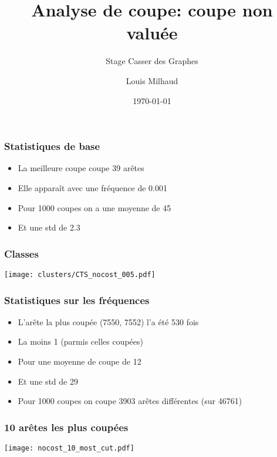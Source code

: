 \documentclass[aspectratio=169]{beamer}
\title{Analyse de coupe: coupe non valuée}
\subtitle{Stage Casser des Graphes}
\author{Louis Milhaud}
\institute{Complex Networks - LIP6}
\date{\today}
\begin{document}
    \begin{frame}
        \titlepage
    \end{frame}

    \begin{frame}
        \frametitle{Statistiques de base}
    
        \begin{itemize}
            \item La meilleure coupe coupe 39 arêtes
            \item Elle apparaît avec une fréquence de 0.001
            \item Pour 1000 coupes on a une moyenne de 45
            \item Et une std de 2.3
        \end{itemize}
    
    \end{frame}

    \begin{frame}
        \frametitle{Classes}
        \centering
        \texttt{[image: clusters/CTS\_nocost\_005.pdf]}    
    \end{frame}

    \begin{frame}
        \frametitle{Statistiques sur les fréquences}
        
        \begin{itemize}
            \item L'arête la plus coupée (7550, 7552) l'a été 530 fois
            \item La moins 1 (parmis celles coupées)
            \item Pour une moyenne de coupe de 12
            \item Et une std de 29
            \item Pour 1000 coupes on coupe 3903 arêtes différentes (sur 46761)
        \end{itemize}
        
    \end{frame}

    \begin{frame}
        \frametitle{10 arêtes les plus coupées}
        \centering
        \texttt{[image: nocost\_10\_most\_cut.pdf]}    
    \end{frame}
\end{document}
